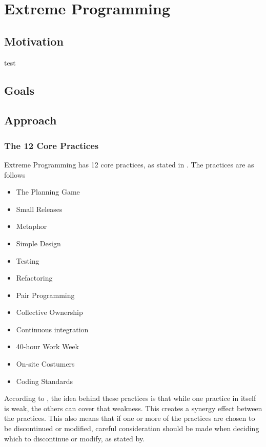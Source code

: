 \section{Extreme Programming}
\subsection{Motivation}
test
\subsection{Goals}
\subsection{Approach}
\subsubsection{The 12 Core Practices}
Extreme Programming has 12 core practices, as stated in \citep{xp:explained}. The practices are as follows

\begin{itemize}
\item The Planning Game
\item Small Releases
\item Metaphor
\item Simple Design
\item Testing
\item Refactoring
\item Pair Programming
\item Collective Ownership
\item Continuous integration
\item 40-hour Work Week
\item On-site Costumers
\item Coding Standards
\end{itemize}

According to \citep[p. 53]{xp:explained}, the idea behind these practices is that while one practice in itself is weak, the others can cover that weakness. This creates a synergy effect between the practices. This also means that if one or more of the practices are chosen to be discontinued or modified, careful consideration should be made when deciding which to discontinue or modify, as stated by.

